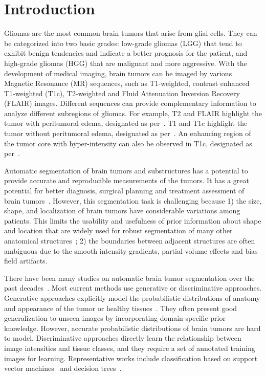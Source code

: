 \documentclass[a4paper,orivec,runningheads]{llncs}
\begin{document}
\section{Introduction}
Gliomas are the most common brain tumors that arise from glial cells. They can be categorized into two basic grades: low-grade gliomas (LGG) that tend to exhibit benign tendencies and indicate a better prognosis for the patient, and high-grade gliomas (HGG) that are malignant and more aggressive. With the development of medical imaging, brain tumors can be imaged by various Magnetic Resonance (MR) sequences, such as T1-weighted, contrast enhanced T1-weighted (T1c), T2-weighted and Fluid Attenuation Inversion Recovery (FLAIR) images. Different sequences can provide complementary information to analyze different subregions of gliomas. For example, T2 and FLAIR highlight the tumor with peritumoral edema, designated  as per~\cite{Menze2015}. T1 and T1c highlight the tumor without peritumoral edema, designated  as per~\cite{Menze2015}. An enhancing region of the tumor core with hyper-intensity can also be observed in T1c, designated  as per~\cite{Menze2015}. 

Automatic segmentation of brain tumors and substructures has a potential to provide accurate and reproducible measurements of the tumors. It has a great potential for better diagnosis, surgical planning and treatment assessment of brain tumors~\cite{Menze2015,Bakas2017}. However, this segmentation task is challenging because 1) the size, shape, and localization of brain tumors have considerable variations among patients. This limits the usability and usefulness of prior information about shape and location that are widely used for robust segmentation of many other anatomical structures~\cite{Wang2015c,Grosgeorge2013}; 2) the boundaries between adjacent structures are often ambiguous due to the smooth intensity gradients, partial volume effects and bias field artifacts.

There have been many studies on automatic brain tumor segmentation over the past decades~\cite{Wang2014b}. Most current methods use generative or discriminative approaches. Generative approaches explicitly model the probabilistic distributions of anatomy and appearance of the tumor or healthy tissues~\cite{Kaus2001,Menze2010a}.  They often present good generalization to unseen images by incorporating domain-specific prior knowledge. However, accurate probabilistic distributions of brain tumors are hard to model. Discriminative approaches directly learn the relationship between image intensities and tissue classes, and they require a set of annotated training images for learning. Representative works include classification based on support vector machines~\cite{Lee2005} and decision trees~\cite{Zikic2012}. 
\end{document}

